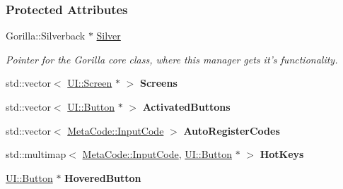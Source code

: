 \subsubsection*{Protected Attributes}
\begin{DoxyCompactItemize}
\item 
\hypertarget{classphys_1_1UIManager_ab4c5b8c7e3c4c7b03847b1af18bea02a}{
Gorilla::Silverback $\ast$ \hyperlink{classphys_1_1UIManager_ab4c5b8c7e3c4c7b03847b1af18bea02a}{Silver}}
\label{d5/dc5/classphys_1_1UIManager_ab4c5b8c7e3c4c7b03847b1af18bea02a}

\begin{DoxyCompactList}\small\item\em Pointer for the Gorilla core class, where this manager gets it's functionality. \item\end{DoxyCompactList}\item 
\hypertarget{classphys_1_1UIManager_aebd9d3b20ad2822e227df77442240557}{
std::vector$<$ \hyperlink{classphys_1_1UI_1_1Screen}{UI::Screen} $\ast$ $>$ {\bfseries Screens}}
\label{d5/dc5/classphys_1_1UIManager_aebd9d3b20ad2822e227df77442240557}

\item 
\hypertarget{classphys_1_1UIManager_a519fd2a2f1febb4c3d2a647a512c7581}{
std::vector$<$ \hyperlink{classphys_1_1UI_1_1Button}{UI::Button} $\ast$ $>$ {\bfseries ActivatedButtons}}
\label{d5/dc5/classphys_1_1UIManager_a519fd2a2f1febb4c3d2a647a512c7581}

\item 
\hypertarget{classphys_1_1UIManager_affa048cc6e6930ba0f0b18fb4ee94c2e}{
std::vector$<$ \hyperlink{classphys_1_1MetaCode_a3e501cbb5bf0f6f1fdb7211465bda8d8}{MetaCode::InputCode} $>$ {\bfseries AutoRegisterCodes}}
\label{d5/dc5/classphys_1_1UIManager_affa048cc6e6930ba0f0b18fb4ee94c2e}

\item 
\hypertarget{classphys_1_1UIManager_a6b43cf8529d403ff13d1ba342847d006}{
std::multimap$<$ \hyperlink{classphys_1_1MetaCode_a3e501cbb5bf0f6f1fdb7211465bda8d8}{MetaCode::InputCode}, \hyperlink{classphys_1_1UI_1_1Button}{UI::Button} $\ast$ $>$ {\bfseries HotKeys}}
\label{d5/dc5/classphys_1_1UIManager_a6b43cf8529d403ff13d1ba342847d006}

\item 
\hypertarget{classphys_1_1UIManager_a37293b9d9ba8b05c9a03e4640a56c6c1}{
\hyperlink{classphys_1_1UI_1_1Button}{UI::Button} $\ast$ {\bfseries HoveredButton}}
\label{d5/dc5/classphys_1_1UIManager_a37293b9d9ba8b05c9a03e4640a56c6c1}


\end{DoxyCompactItemize}
